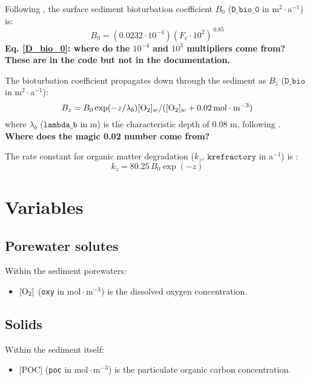 \documentclass[a4paper]{article}
\newcommand{\code}[1]{\texttt{#1}}
\newcommand{\molmmm}{\mathrm{mol}\cdot\mathrm{m}^{-3}}
\newcommand{\wtf}[1]{\textcolor{Cerulean}{\textbf{#1}}}
\begin{document}
Following \citet{archer_model_2002}, the surface sediment bioturbation coefficient $B_0$ ($\code{D\_bio\_0}$ in m$^2\cdot$a$^{-1}$) is:
\begin{equation}\label{D_bio_0}
B_0 = (0.0232 \cdot 10^{-4}) (F_c \cdot 10^2)^{\,0.85}
\end{equation}
\wtf{Eq. \eqref{D_bio_0}: where do the $10^{-4}$ and $10^2$ multipliers come from? These are in the code but not in the documentation.}

The bioturbation coefficient propagates down through the sediment as $B_z$ ($\code{D\_bio}$ in m$^2\cdot$a$^{-1}$):
\begin{equation}\label{B_z}
B_z = B_0 \exp(-z/\lambda_b) [\ce{O2}]_w / ([\ce{O2}]_w + 0.02 \, \molmmm)
\end{equation}
where $\lambda_b$ ($\code{lambda\_b}$ in m) is the characteristic depth of 0.08 m, following \citet{sayles_benthic_2001}. \wtf{Where does the magic 0.02 number come from?}

The rate constant for organic matter degradation ($k_z$, $\code{krefractory}$ in a$^{-1}$) is \citep{archer_model_2002}:
\begin{equation}\label{k_poc_degradation}
k_z = 80.25 \, B_0 \exp(-z)
\end{equation}

\section{Variables}

\subsection{Porewater solutes}

Within the sediment porewaters:
\begin{itemize}
  \item $[\ce{O2}]$ (\code{oxy} in $\molmmm$) is the dissolved oxygen concentration.
\end{itemize}

\subsection{Solids}

Within the sediment itself:
\begin{itemize}
  \item $[$POC$]$ (\code{poc} in $\molmmm$) is the particulate organic carbon concentration.
\end{itemize}
\end{document}

